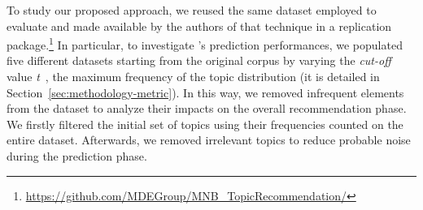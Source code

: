 

To study our proposed approach, we reused the same dataset employed to evaluate 
\MNB and made available by the authors of that technique in a replication 
package.\footnote{\url{https://github.com/MDEGroup/MNB\_TopicRecommendation/}} 
%
%
In particular, to investigate \TF's prediction performances, we populated five 
different datasets starting from the original \MNB corpus by varying the 
\textit{cut-off} value \emph{t}~\cite{10.1145/3383219.3383227}, \ie the 
maximum frequency of the topic distribution (it 
is detailed in Section~\ref{sec:methodology-metric}). In this way, we removed 
infrequent elements from the dataset to analyze their impacts on the overall 
recommendation phase. We firstly filtered the initial set of topics using their 
frequencies counted on the entire \GH dataset. Afterwards, we removed 
irrelevant topics to reduce probable noise during the prediction phase. 


